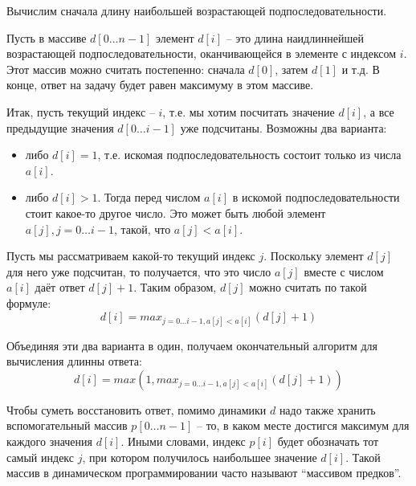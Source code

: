 \documentclass[a4paper,11pt]{article}
\begin{document}
Вычислим сначала длину наибольшей возрастающей подпоследовательности.

Пусть в массиве $d[0 \ldots n-1]$ элемент $d[i]$ -- это длина наидлиннейшей
возрастающей подпоследовательности, оканчивающейся в элементе с индексом $i$.
Этот массив можно считать постепенно: сначала $d[0]$, затем $d[1]$ и т.д. В
конце, ответ на задачу будет равен максимуму в этом массиве.

Итак, пусть текущий индекс -- $i$, т.е. мы хотим посчитать значение $d[i]$, а
все предыдущие значения $d[0 \ldots i-1]$ уже подсчитаны. Возможны два варианта:
\begin{itemize}
\item либо $d[i] = 1$, т.е. искомая подпоследовательность состоит только из
  числа $a[i]$.
\item либо $d[i] > 1$. Тогда перед числом $a[i]$ в искомой подпоследовательности
  стоит какое-то другое число. Это может быть любой элемент
  $a[j], j = 0 \ldots i-1$, такой, что $a[j] < a[i]$.
\end{itemize}
Пусть мы рассматриваем какой-то текущий индекс $j$. Поскольку элемент $d[j]$ для
него уже подсчитан, то получается, что это число $a[j]$ вместе с числом $a[i]$
даёт ответ $d[j] + 1$. Таким образом, $d[j]$ можно считать по такой формуле:
\begin{equation*}
  d[i] = max_{j=0 \ldots i-1, a[j] < a[i]} (d[j] + 1)
\end{equation*}

Объединяя эти два варианта в один, получаем окончательный алгоритм для
вычисления длинны ответа:
\begin{equation*}
  d[i] = max(1, max_{j=0 \ldots i-1, a[j] < a[i]} (d[j] + 1))
\end{equation*}

Чтобы суметь восстановить ответ, помимо динамики $d$ надо также хранить
вспомогательный массив $p[0 \ldots n-1]$ -- то, в каком месте достигся максимум
для каждого значения $d[i]$. Иными словами, индекс $p[i]$ будет обозначать тот
самый индекс $j$, при котором получилось наибольшее значение $d[i]$. Такой
массив в динамическом программировании часто называют ``массивом предков''.
\end{document}

